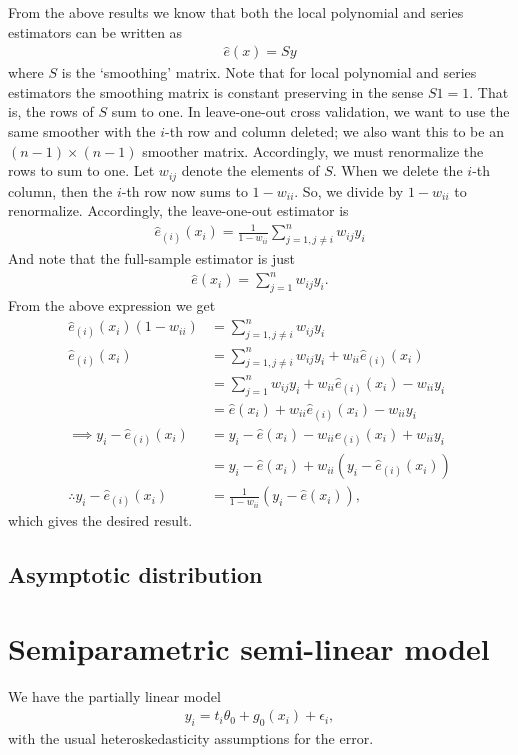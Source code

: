 \documentclass[12pt]{article}
\newcommand{\e}{\epsilon}
\newcommand{\mtx}[1]{\ensuremath{\bm{\mathit{#1}}}}
\begin{document}
From the above results we know that both the local polynomial and series estimators can be written as
\begin{align*}
\hat{\mtx{e}}(x) = \mtx{S}\mtx{y}
\end{align*}
where $\mtx{S}$ is the `smoothing' matrix. Note that for local polynomial and series estimators the smoothing matrix is constant preserving in the sense $\mtx{S}{\mtx{1}} = \mtx{1}$. That is, the rows of \mtx{S} sum to one. In leave-one-out cross validation, we want to use the same smoother with the $i$-th row and column deleted; we also want this to be an $(n -1) \times (n - 1)$ smoother matrix. Accordingly, we must renormalize the rows to sum to one. Let $w_{ij}$ denote the elements of $\mtx{S}$. When we delete the $i$-th column, then the $i$-th row now sums to $1- w_{ii}$. So, we divide by $1- w_{ii}$ to renormalize. Accordingly, the leave-one-out estimator is
\begin{align*}
\hat e_{(i)}(x_i) = \frac{1}{1-w_{ii}} \sum_{j=1,j\neq i}^n w_{ij}y_i
\end{align*}
And note that the full-sample estimator is just
\begin{align*}
\hat e(x_i) = \sum_{j=1}^n w_{ij}y_i.
\end{align*}
From the above expression we get
\begin{align*}
\hat e_{(i)}(x_i)(1-w_{ii}) &=\sum_{j=1,j\neq i}^n w_{ij}y_i\\
\hat e_{(i)}(x_i) &= \sum_{j=1,j\neq i}^n w_{ij}y_i + w_{ii}\hat e_{(i)}(x_i)\\
&=\sum_{j=1}^n w_{ij}y_i + w_{ii}\hat e_{(i)}(x_i) - w_{ii}y_i\\
&=\hat e(x_i)  + w_{ii}\hat e_{(i)}(x_i) - w_{ii}y_i\\
\implies y_i - \hat e_{(i)}(x_i) &= y_i -\hat e(x_i)  - w_{ii}\hat e_{(i)}(x_i) + w_{ii}y_i\\
&=y_i - \hat e(x_i) + w_{ii}(y_i - \hat e_{(i)}(x_i))\\
\therefore y_i - \hat e_{(i)}(x_i) &= \frac{1}{1-w_{ii}}(y_i - \hat e(x_i)),
\end{align*}
which gives the desired result.

\subsection{Asymptotic distribution}

\newpage

\section{Semiparametric semi-linear model}
We have the partially linear model
\begin{align}
y_i = t_i \theta_0 + g_0(\mtx{x_i}) + \e_i, \label{eq:3a}
\end{align}
with the usual heteroskedasticity assumptions for the error.
\end{document}
